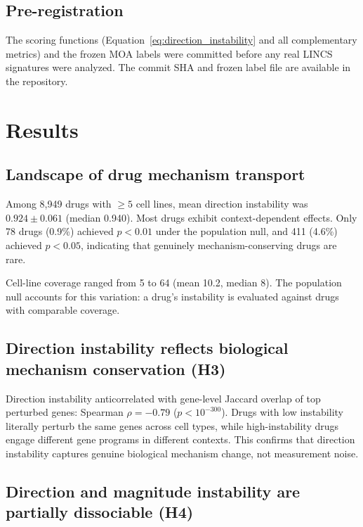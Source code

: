 \documentclass{article}
\begin{document}
\subsection{Pre-registration}

The scoring functions (Equation~\ref{eq:direction_instability} and all
complementary metrics) and the frozen MOA labels were committed before any
real LINCS signatures were analyzed. The commit SHA and frozen label file
are available in the repository.

\section{Results}

\subsection{Landscape of drug mechanism transport}

Among 8{,}949 drugs with $\geq5$ cell lines, mean direction instability
was $0.924 \pm 0.061$ (median 0.940). Most drugs exhibit context-dependent
effects. Only 78 drugs (0.9\%) achieved $p < 0.01$ under the population
null, and 411 (4.6\%) achieved $p < 0.05$, indicating that genuinely
mechanism-conserving drugs are rare.

Cell-line coverage ranged from 5 to 64 (mean 10.2, median 8). The
population null accounts for this variation: a drug's instability is
evaluated against drugs with comparable coverage.

\subsection{Direction instability reflects biological mechanism conservation (H3)}

Direction instability anticorrelated with gene-level Jaccard overlap of
top perturbed genes: Spearman $\rho = -0.79$ ($p < 10^{-300}$). Drugs with
low instability literally perturb the same genes across cell types, while
high-instability drugs engage different gene programs in different contexts.
This confirms that direction instability captures genuine biological
mechanism change, not measurement noise.

\subsection{Direction and magnitude instability are partially dissociable (H4)}
\end{document}
